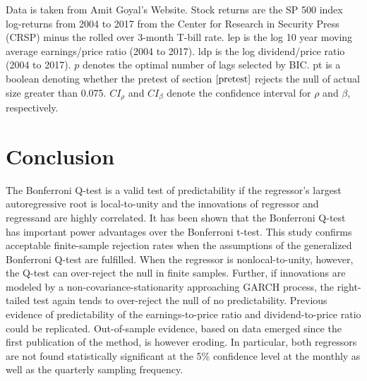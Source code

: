 \documentclass{article}
\begin{document}
\begin{table}[ht]
\begin{threeparttable}
 \begin{tablenotes}
 \small
\item Data is taken from Amit Goyal’s Website. Stock returns are the SP 500 index log-returns from 2004 to 2017 from the Center for Research in Security Press (CRSP) minus the rolled over 3-month T-bill rate. lep is the log 10 year moving average earnings/price ratio (2004 to 2017). ldp is the log dividend/price ratio (2004 to 2017).
$p$ denotes the optimal number of lags selected by BIC. pt is a boolean denoting whether the pretest of section $\ref{pretest}$ rejects the null of actual size greater than 0.075. $CI_{\rho}$ and $CI_{\beta}$ denote the confidence interval for $\rho$ and $\beta$, respectively.
\end{tablenotes}
\end{threeparttable}
\end{table}

\section{Conclusion}
\label{conclusion}

The Bonferroni Q-test is a valid test of predictability if the regressor's largest autoregressive root is local-to-unity and the innovations of regressor and regressand are highly correlated. It has been shown that the Bonferroni Q-test has important power advantages over the Bonferroni t-test. This study confirms acceptable finite-sample rejection rates when the assumptions of the generalized Bonferroni Q-test are fulfilled. When the regressor is nonlocal-to-unity, however, the Q-test can over-reject the null in finite samples. Further, if innovations are modeled by a non-covariance-stationarity approaching GARCH process, the right-tailed test again tends to over-reject the null of no predictability. Previous evidence of predictability of the earnings-to-price ratio and dividend-to-price ratio could be replicated. Out-of-sample evidence, based on data emerged since the first publication of the method, is however eroding. In particular, both regressors are not found statistically significant at the 5\% confidence level at the monthly as well as the quarterly sampling frequency.

\pagebreak
\end{document}
